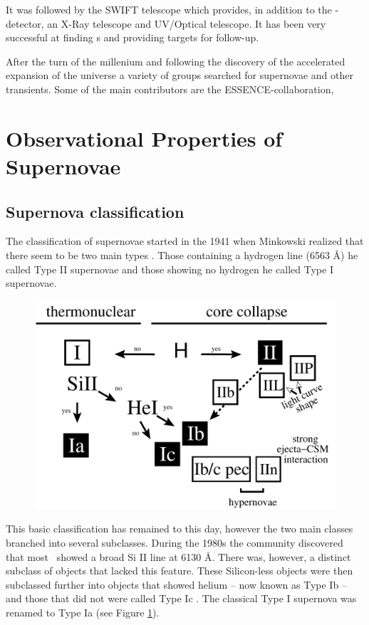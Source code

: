It was followed by the SWIFT telescope which provides, in addition to the \gammaray-detector, an X-Ray telescope and UV/Optical telescope. It has been very successful at finding \grb s and providing targets for follow-up.

After the turn of the millenium and following the discovery of the accelerated expansion of the universe a variety of groups searched for supernovae and other transients. Some of the main contributors are the ESSENCE-collaboration, 

\section{Observational Properties of Supernovae}

\subsection{Supernova classification}
\label{sec:sn_classification}

The classification of supernovae started in the 1941 when Minkowski realized that there seem to be two main types \citep{1941PASP...53..224M}. Those containing a hydrogen line (6563 \AA) he called Type II supernovae and those showing no hydrogen he called Type I supernovae.  

\begin{figure}[htbp] %
   \centering
   \includegraphics[width=\textwidth]{chapter_intro/plots/sn_classification.pdf} 
   \caption{}
   \label{fig:sn_classification}
\end{figure}

This basic classification has remained to this day, however the two main classes branched into several subclasses.
During the 1980s the community discovered that most \sneia\ showed a broad Si II line at 6130 \AA. There was, however, a distinct subclass of objects that lacked this feature. These Silicon-less objects were then subclassed further into objects that showed helium -- now known as Type Ib --  and those that did not were called Type Ic \citep{1987ApJ...317..355H, 1986ApJ...306L..77G}. The classical Type I supernova was renamed to Type Ia (see Figure \ref{fig:sn_classification}). 

